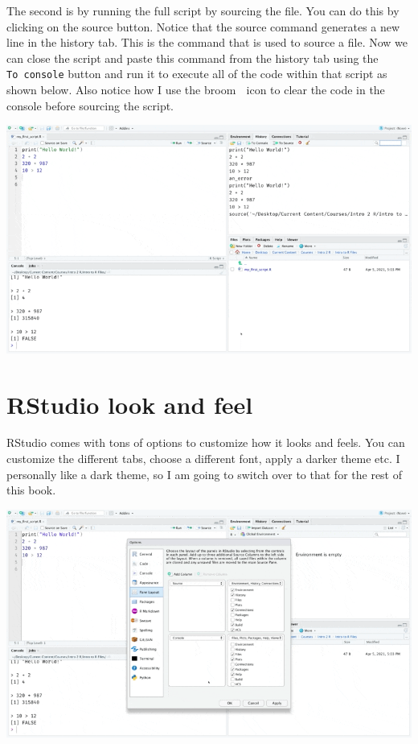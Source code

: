 \documentclass[
]{book}
\begin{document}
The second is by running the full script by sourcing the file. You can do this by clicking on the source button. Notice that the source command generates a new line in the history tab. This is the command that is used to source a file. Now we can close the script and paste this command from the history tab using the \texttt{To\ console} button and run it to execute all of the code within that script as shown below. Also notice how I use the broom 🧹 icon to clear the code in the console before sourcing the script.

\includegraphics{assets/ch_1-setup/gifs/run_file.gif}

\hypertarget{rstudio-look-and-feel}{%
\section{RStudio look and feel}\label{rstudio-look-and-feel}}

RStudio comes with tons of options to customize how it looks and feels. You can customize the different tabs, choose a different font, apply a darker theme etc. I personally like a dark theme, so I am going to switch over to that for the rest of this book.

\includegraphics{assets/ch_1-setup/gifs/dark.gif}
\end{document}
